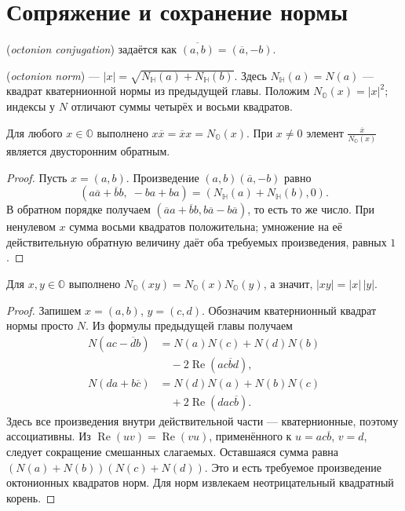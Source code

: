 \section{Сопряжение и сохранение нормы}
\begin{definition}
 (\emph{octonion conjugation}) задаётся как \(\overline{(a,b)}=(\overline a,-b)\).
\end{definition}
\begin{definition}
 (\emph{octonion norm}) — \(|x|=\sqrt{N_{\mathbb H}(a)+N_{\mathbb H}(b)}\). Здесь \(N_{\mathbb H}(a)=N(a)\) — квадрат кватернионной нормы из предыдущей главы. Положим \(N_{\mathbb O}(x)=|x|^2\); индексы у \(N\) отличают суммы четырёх и восьми квадратов.
\end{definition}
\begin{theorem}\label{thm:legacy-c25-2}
Для любого \(x\in\mathbb O\) выполнено \(x\overline x=\overline x x=N_{\mathbb O}(x)\). При \(x\ne0\) элемент \(\frac{\overline x}{N_{\mathbb O}(x)}\) является двусторонним обратным.
\end{theorem}
\begin{proof}
Пусть \(x=(a,b)\). Произведение \((a,b)(\overline a,-b)\) равно
\[
(a\overline a+\overline b b,\;-ba+ba)=(N_{\mathbb H}(a)+N_{\mathbb H}(b),0).
\]
В обратном порядке получаем \((\overline a a+\overline b b,b\overline a-b\overline a)\), то есть то же число. При ненулевом \(x\) сумма восьми квадратов положительна; умножение на её действительную обратную величину даёт оба требуемых произведения, равных \(1\).
\end{proof}
\begin{theorem}\label{thm:legacy-c25-3}
Для \(x,y\in\mathbb O\) выполнено \(N_{\mathbb O}(xy)=N_{\mathbb O}(x)N_{\mathbb O}(y)\), а значит, \(|xy|=|x|\,|y|\).
\end{theorem}
\begin{proof}
Запишем \(x=(a,b)\), \(y=(c,d)\). Обозначим кватернионный квадрат нормы просто \(N\). Из формулы предыдущей главы получаем
\[
\begin{aligned}
N(ac-\overline d b)&=N(a)N(c)+N(d)N(b)\\
&\quad-2\operatorname{Re}(ac\overline b d),\\
N(da+b\overline c)&=N(d)N(a)+N(b)N(c)\\
&\quad+2\operatorname{Re}(dac\overline b).
\end{aligned}
\]
Здесь все произведения внутри действительной части — кватернионные, поэтому ассоциативны. Из \(\operatorname{Re}(uv)=\operatorname{Re}(vu)\), применённого к \(u=ac\overline b\), \(v=d\), следует сокращение смешанных слагаемых. Оставшаяся сумма равна \((N(a)+N(b))(N(c)+N(d))\). Это и есть требуемое произведение октонионных квадратов норм. Для норм извлекаем неотрицательный квадратный корень.
\end{proof}
